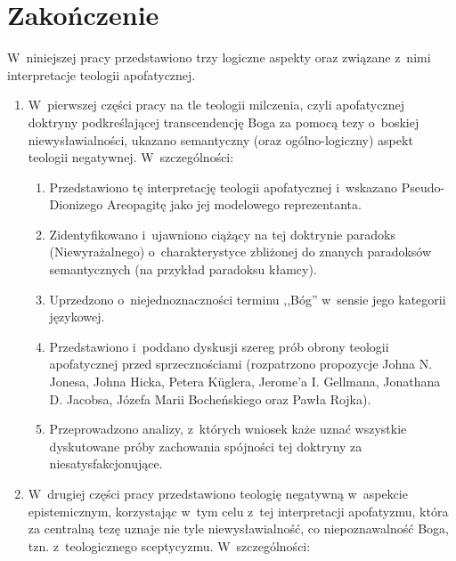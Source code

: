 \chapter*{Zakończenie}

\setcounter{footnote}{0}

W~niniejszej pracy przedstawiono trzy logiczne aspekty oraz związane z~nimi interpretacje teologii apofatycznej.

\begin{enumerate}
\item  W~pierwszej części pracy na tle teologii milczenia, czyli apofatycznej doktryny podkreślającej transcendencję Boga za pomocą tezy o~boskiej niewysławialności, ukazano semantyczny (oraz ogólno-logiczny) aspekt teologii negatywnej. W~szczególności:
\begin{enumerate}
\item Przedstawiono tę interpretację teologii apofatycznej i~wskazano Pseudo-Dionizego Areopagitę jako jej modelowego reprezentanta.
\item Zidentyfikowano i~ujawniono ciążący na tej doktrynie paradoks (Niewyrażalnego) o~charakterystyce zbliżonej do znanych paradoksów semantycznych (na przykład paradoksu kłamcy).
\item Uprzedzono o~niejednoznaczności terminu ,,Bóg'' w~sensie jego kategorii językowej.
\item Przedstawiono i~poddano dyskusji szereg prób obrony teologii apofatycznej przed sprzecznościami (rozpatrzono propozycje Johna N. Jonesa, Johna Hicka, Petera Küglera, Jerome'a I. Gellmana, Jonathana D. Jacobsa, Józefa Marii Bocheńskiego oraz Pawła Rojka).
\item Przeprowadzono analizy, z~których wniosek każe uznać wszystkie dyskutowane próby zachowania spójności tej doktryny za niesatysfakcjonujące.
\end{enumerate}
\item W~drugiej części pracy przedstawiono teologię negatywną w~aspekcie epistemicznym, korzystając w~tym celu z~tej interpretacji apofatyzmu, która za centralną tezę uznaje nie tyle niewysławialność, co niepoznawalność Boga, tzn. z~teologicznego sceptycyzmu. W~szczególności:

\end{enumerate}
